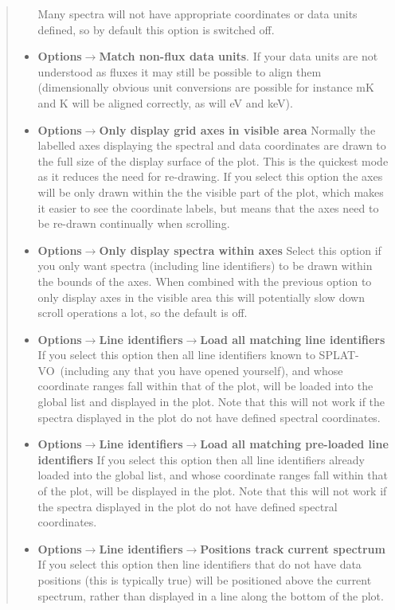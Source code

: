 \documentclass[twoside,11pt]{article}
\newcommand{\latexhtml}[2]{#1}
\renewcommand{\_}{\texttt{\symbol{95}}}
\newcommand{\SPLAT}{\textsf{SPLAT-VO}}
\newcommand{\submenuitem}[2]{\latexhtml{\textbf{#1$\rightarrow$#2}}{\textbf{#1->#2}}}
\newcommand{\subsubmenuitem}[3]{\latexhtml{\textbf{#1$\rightarrow$#2$\rightarrow$#3}}{\textbf{#1->#2->#3}}}
\begin{document}
\begin{quote}
\begin{itemize}
  Many spectra will not have appropriate coordinates or data units defined, so
  by default this option is switched off.

  \item \submenuitem{Options}{Match non-flux data units}.
  If your data units are not understood as fluxes it may still be possible to
  align them (dimensionally obvious unit conversions are possible for instance
  mK and K will be aligned correctly, as will eV and keV).

  \item \submenuitem{Options}{Only display grid axes in visible area}
  Normally the labelled axes displaying the spectral and data coordinates are
  drawn to the full size of the display surface of the plot. This is the
  quickest mode as it reduces the need for re-drawing. If you select this
  option the axes will be only drawn within the the visible part of the plot,
  which makes it easier to see the coordinate labels, but means that the axes
  need to be re-drawn continually when scrolling.

  \item \submenuitem{Options}{Only display spectra within axes}
  Select this option if you only want spectra (including line identifiers) to
  be drawn within the bounds of the axes. When combined with the previous
  option to only display axes in the visible area this will potentially slow
  down scroll operations a lot, so the default is off.

  \item \subsubmenuitem{Options}{Line identifiers}{Load all matching line identifiers}
  If you select this option then all line identifiers known to \SPLAT\
  (including any that you have opened yourself), and whose coordinate ranges
  fall within that of the plot, will be loaded into the global list and
  displayed in the plot. Note that this will not work if the spectra displayed
  in the plot do not have defined spectral coordinates.

  \item \subsubmenuitem{Options}{Line identifiers}{Load all matching pre-loaded line identifiers}
  If you select this option then all line identifiers already loaded into the
  global list, and whose coordinate ranges fall within that of the plot, will
  be displayed in the plot. Note that this will not work if the spectra
  displayed in the plot do not have defined spectral coordinates.

  \item \subsubmenuitem{Options}{Line identifiers}{Positions track current spectrum}
  If you select this option then line identifiers that do not have data
  positions (this is typically true) will be positioned above the current
  spectrum, rather than displayed in a line along the bottom of the plot.


\end{itemize}
\end{quote}
\end{document}
